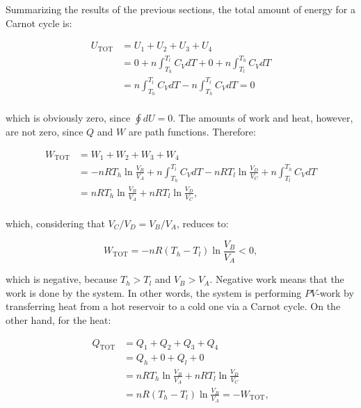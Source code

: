 \documentclass[
]{book}
\theoremstyle{definition}
\theoremstyle{definition}
\theoremstyle{definition}
\theoremstyle{remark}
\begin{document}
Summarizing the results of the previous sections, the total amount of energy for a Carnot cycle is:

\begin{equation}
\begin{aligned}
  U_{\text{TOT}} & = U_1+U_2+U_3+U_4 \\
                 & = 0 + n \int_{T_h}^{T_l} C_V dT + 0 + n \int_{T_l}^{T_h} C_V dT  \\
                 & = n \int_{T_h}^{T_l} C_V dT - n \int_{T_h}^{T_l} C_V dT = 0 \\
\end{aligned}
  \label{eq:UtotCC}
\end{equation}

which is obviously zero, since \(\oint dU=0\). The amounts of work and heat, however, are not zero, since \(Q\) and \(W\) are path functions. Therefore:

\begin{equation}
\begin{aligned}
  W_{\text{TOT}} & = W_1+W_2+W_3+W_4 \\
                 & = - nRT_h \ln \frac{V_B}{V_A} + n \int_{T_h}^{T_l} C_V dT - nRT_l \ln \frac{V_D}{V_C} + n \int_{T_l}^{T_h} C_V dT \\
                 & = nRT_h \ln \frac{V_B}{V_A} + nRT_l \ln \frac{V_D}{V_C}, \\
\end{aligned}
  \label{eq:WtotCC}
\end{equation}

which, considering that \(V_C/V_D=V_B/V_A\), reduces to:

\begin{equation}
  W_{\text{TOT}} = - nR \left( T_h-T_l \right) \ln \frac{V_B}{V_A} < 0,
  \label{eq:WtotCC2}
\end{equation}

which is negative, because \(T_h>T_l\) and \(V_B>V_A\). Negative work means that the work is done by the system. In other words, the system is performing \(PV\)-work by transferring heat from a hot reservoir to a cold one via a Carnot cycle. On the other hand, for the heat:

\begin{equation}
\begin{aligned}
  Q_{\text{TOT}} & = Q_1+Q_2+Q_3+Q_4 \\
                 & = Q_h + 0 + Q_l + 0    \\
                 & = nRT_h \ln \frac{V_B}{V_A} + nRT_l \ln \frac{V_D}{V_C} \\
                 & = nR \left( T_h-T_l \right) \ln \frac{V_B}{V_A} = -W_{\text{TOT}},
\end{aligned}
  \label{eq:QtotCC}
\end{equation}
\end{document}
